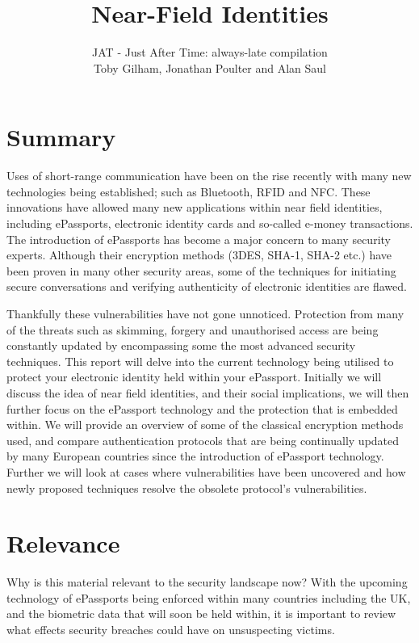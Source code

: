 \documentclass[12pt]{article}
\title{Near-Field Identities}
\author{JAT - Just After Time: always-late compilation\\Toby Gilham, Jonathan Poulter and Alan Saul}
\date{}                                           %
\begin{document}
\maketitle
\newpage
\section{Summary}
Uses of short-range communication have been on the rise recently with many new technologies being established; such as Bluetooth, RFID and NFC. These innovations have allowed many new applications within near field identities, including ePassports, electronic identity cards and so-called e-money transactions. The introduction of ePassports has become a major concern to many security experts. Although their encryption methods (3DES, SHA-1, SHA-2 etc.) have been proven in many other security areas, some of the techniques for initiating secure conversations and verifying authenticity of electronic identities are flawed.

Thankfully these vulnerabilities have not gone unnoticed. Protection from many of the threats such as skimming, forgery and unauthorised access are being constantly updated by encompassing some the most advanced security techniques. 
This report will delve into the current technology being utilised to protect your electronic identity held within your ePassport. Initially we will discuss the idea of near field identities, and their social implications, we will then further focus on the ePassport technology and the protection that is embedded within. We will provide an overview of some of the classical encryption methods used, and compare authentication protocols that are being continually updated by many European countries since the introduction of ePassport technology. Further we will look at cases where vulnerabilities have been uncovered and how newly proposed techniques resolve the obsolete protocol's vulnerabilities.


\section{Relevance}
Why is this material relevant to the security landscape now?
With the upcoming technology of ePassports being enforced within many countries including the UK, and the biometric data that will soon be held within, it is important to review what effects security breaches could have on unsuspecting victims.
\end{document}
